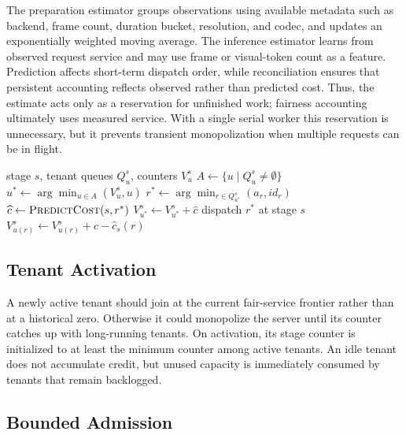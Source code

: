 \documentclass[sigplan,anonymous,review,nonacm]{acmart}
\begin{document}
The preparation estimator groups observations using available metadata such
as backend, frame count, duration bucket, resolution, and codec, and updates
an exponentially weighted moving average. The inference estimator learns from
observed request service and may use frame or visual-token count as a feature.
Prediction affects short-term dispatch order, while reconciliation ensures
that persistent accounting reflects observed rather than predicted cost.
Thus, the estimate acts only as a reservation for unfinished work; fairness
accounting ultimately uses measured service. With a single serial worker this
reservation is unnecessary, but it prevents transient monopolization when
multiple requests can be in flight.

\begin{algorithm}[t]
\caption{Stage-wise Unweighted Max-Min Scheduling}
\label{alg:max-min}
\begin{algorithmic}[1]
\Require stage $s$, tenant queues $Q^s_u$, counters $V^s_u$
    \State $A \gets \{u\mid Q^s_u\neq\emptyset\}$
        \State $u^* \gets \arg\min_{u\in A}(V^s_u,u)$
        \State $r^* \gets \arg\min_{r\in Q^s_{u^*}}(a_r,id_r)$
        \State $\widehat c \gets \Call{PredictCost}{s,r^*}$
        \State $V^s_{u^*}\gets V^s_{u^*}+\widehat c$
        \State dispatch $r^*$ at stage $s$
    \EndIf
\EndWhen
{}
    \State $V^s_{u(r)}\gets V^s_{u(r)}+c-\widehat c_s(r)$
    \State {}
\EndWhen
\end{algorithmic}
\end{algorithm}

\subsection{Tenant Activation}

A newly active tenant should join at the current fair-service frontier rather
than at a historical zero. Otherwise it could monopolize the server until its
counter catches up with long-running tenants. On activation, its stage counter
is initialized to at least the minimum counter among active tenants. An idle
tenant does not accumulate credit, but unused capacity is immediately consumed
by tenants that remain backlogged.

\subsection{Bounded Admission}
\end{document}
